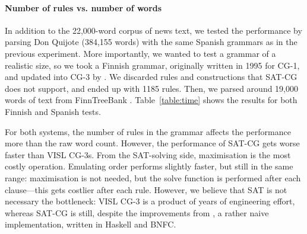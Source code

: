 \paragraph{Number of rules vs. number of words}

In addition to the 22,000-word corpus of news text,
we tested the performance by parsing Don Quijote (384,155 words) with
the same Spanish grammars as in the previous experiment. 
%
%
More importantly, we wanted to test a grammar of a realistic size, 
so we took a Finnish grammar, originally written in 1995 for CG-1, 
and updated into CG-3 by \cite{pirinen2015}.
We discarded rules and constructions that SAT-CG does not support, and ended up with
1185 rules. Then, we parsed around 19,000 words of text from FinnTreeBank \cite{voutilainen2011finntreebank}.
Table~\ref{table:time} shows the results for both Finnish and Spanish tests.

For both systems, the number of rules in the grammar affects the performance 
more than the raw word count.
However, the performance of SAT-CG gets worse faster than VISL CG-3s.
From the SAT-solving side, maximisation is the most costly operation. 
Emulating order performs slightly faster, but still in the same range: 
maximisation is not needed, but the solve function is performed after 
each clause---this gets costlier after each rule.
However, we believe that SAT is not necessary the bottleneck:
VISL CG-3 is a product of years of engineering effort, whereas SAT-CG
is still, despite the improvements from \cite{listenmaa_claessen2015},
a rather naive implementation, written in Haskell and BNFC.


